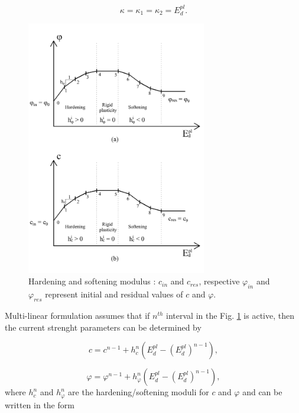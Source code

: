 \begin{equation}\label{eq:kappa}
	\kappa = \kappa_{1} = \kappa_{2} = E_d^{pl}.
\end{equation}

\begin{figure}[h!]
	\centering	
	\includegraphics[width=0.70\textwidth, angle=0]{obrazky/hardening_softening_modulus_my.png}
	\caption[Hardening and softening modulus]{Hardening and softening modulus \cite{geofem}: $c_{in}$ and $c_{res}$, respective $\varphi_{in}$ and $\varphi_{res}$ represent initial and residual values of $c$ and $\varphi$.} \label{obr:H}
\end{figure}
 
Multi-linear formulation assumes that if $n^{th}$ interval in the Fig. \ref{obr:H} is active, then the current strenght parameters can be determined by

\begin{equation}\label{eq:c}
	c = c^{n-1} + h_c^n \left( E_d^{pl} -(E_d^{pl})^{n-1} \right),
\end{equation}

\begin{equation}\label{eq:phi}
\varphi = \varphi^{n-1} + h_\varphi^n\left( E_d^{pl} - (E_d^{pl})^{n-1} \right),
\end{equation}
where $h_c^n$ and $h_\varphi^n$ are the hardening/softening moduli for $c$ and $\varphi$ and can be written in the form


